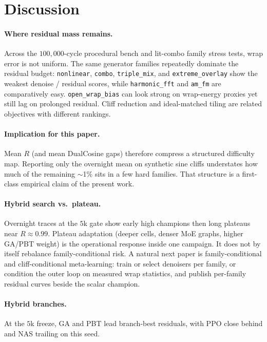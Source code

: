 \section{Discussion}
\label{sec:discussion}

\paragraph{Where residual mass remains.}
Across the $100{,}000$-cycle procedural bench and lit-combo family stress tests, wrap error is not uniform.
The same generator families repeatedly dominate the residual budget: \texttt{nonlinear}, \texttt{combo}, \texttt{triple\_mix}, and \texttt{extreme\_overlay} show the weakest denoise / residual scores, while \texttt{harmonic\_fft} and \texttt{am\_fm} are comparatively easy.
\texttt{open\_wrap\_bias} can look strong on wrap-energy proxies yet still lag on prolonged residual. Cliff reduction and ideal-matched tiling are related objectives with different rankings.

\paragraph{Implication for this paper.}
Mean $R$ (and mean DualCosine gaps) therefore compress a structured difficulty map.
Reporting only the overnight mean on synthetic sine cliffs understates how much of the remaining $\sim$1\% sits in a few hard families.
That structure is a first-class empirical claim of the present work.

\paragraph{Hybrid search vs.\ plateau.}
Overnight traces at the $5$k gate show early high champions then long plateaus near $R\approx 0.99$.
Plateau adaptation (deeper cells, denser MoE graphs, higher GA/PBT weight) is the operational response inside one campaign. It does not by itself rebalance family-conditional risk.
A natural next paper is family-conditional and cliff-conditional meta-learning: train or select denoisers per family, or condition the outer loop on measured wrap statistics, and publish per-family residual curves beside the scalar champion.

\paragraph{Hybrid branches.}
At the $5$k freeze, GA and PBT lead branch-best residuals, with PPO close behind and NAS trailing on this seed.
